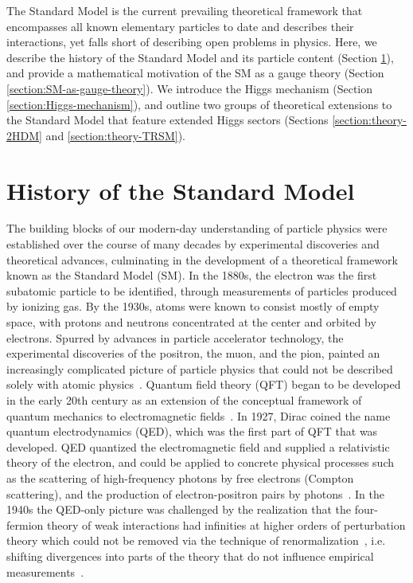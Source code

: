 The Standard Model is the current prevailing theoretical framework that encompasses all known elementary particles to date and describes their interactions, yet falls short of describing open problems in physics. Here, we describe the history of the Standard Model and its particle content (Section \ref{section:SM-history}), and provide a mathematical motivation of the SM as a gauge theory (Section \ref{section:SM-as-gauge-theory}). We introduce the Higgs mechanism (Section \ref{section:Higgs-mechanism}), and outline two groups of theoretical extensions to the Standard Model that feature extended Higgs sectors (Sections \ref{section:theory-2HDM} and \ref{section:theory-TRSM}).

\section{History of the Standard Model}
\label{section:SM-history}
The building blocks of our modern-day understanding of particle physics were established over the course of many decades by experimental discoveries and theoretical advances, culminating in the development of a theoretical framework known as the Standard Model (SM). In the 1880s, the electron was the first subatomic particle to be identified, through measurements of particles produced by ionizing gas. By the 1930s, atoms were known to consist mostly of empty space, with protons and neutrons concentrated at the center and orbited by electrons. Spurred by advances in particle accelerator technology, the experimental discoveries of the positron, the muon, and the pion, painted an increasingly complicated picture of particle physics that could not be described solely with atomic physics~\cite{frampton_journeys_2001}. Quantum field theory (QFT) began to be developed in the early 20th century as an extension of the conceptual framework of quantum mechanics to electromagnetic fields~\cite{sep-quantum-field-theory}. In 1927, Dirac coined the name quantum electrodynamics (QED), which was the first part of QFT that was developed. QED quantized the electromagnetic field and supplied a relativistic theory of the electron, and could be applied to concrete physical processes such as the scattering of high-frequency photons by free electrons (Compton scattering), and the production of electron-positron pairs by photons~\cite{sep-quantum-field-theory}. In the 1940s the QED-only picture was challenged by the realization that the four-fermion theory of weak interactions had infinities at higher orders of perturbation theory which could not be removed via the technique of renormalization~\cite{Weinberg:799984}, i.e. shifting divergences into parts of the theory that do not influence empirical measurements~\cite{sep-quantum-field-theory}. 

